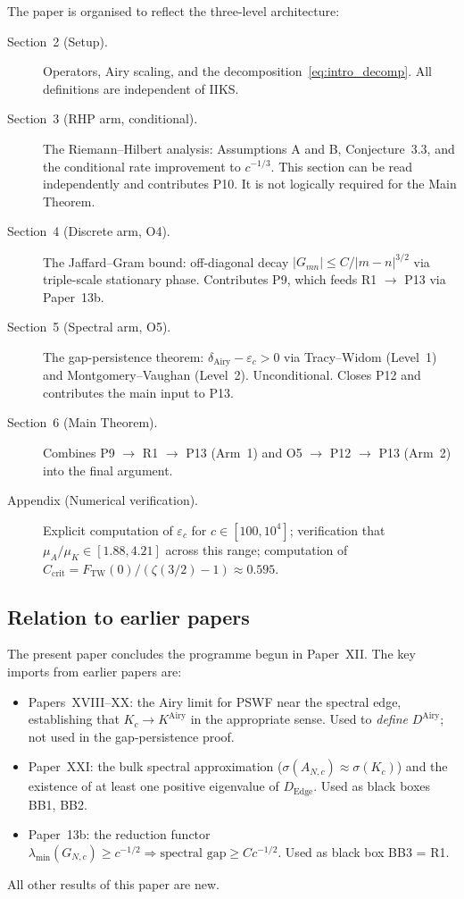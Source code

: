 \documentclass[12pt,a4paper]{amsart}
\newcommand{\DAi}{D^{\mathrm{Airy}}}
\newcommand{\KAi}{K^{\mathrm{Airy}}}
\begin{document}
The paper is organised to reflect the three-level architecture:

\begin{description}
  \item[Section~2 (Setup).]
    Operators, Airy scaling, and the decomposition~\eqref{eq:intro_decomp}.
    All definitions are independent of IIKS.

  \item[Section~3 (RHP arm, conditional).]
    The Riemann--Hilbert analysis: Assumptions A and B, Conjecture~3.3,
    and the conditional rate improvement to $c^{-1/3}$.
    This section can be read independently and contributes P10.
    It is not logically required for the Main Theorem.

  \item[Section~4 (Discrete arm, O4).]
    The Jaffard--Gram bound: off-diagonal decay $|G_{mn}| \le C/|m-n|^{3/2}$
    via triple-scale stationary phase.
    Contributes P9, which feeds R1 $\to$ P13 via Paper~13b.

  \item[Section~5 (Spectral arm, O5).]
    The gap-persistence theorem: $\delta_{\mathrm{Airy}} - \varepsilon_c > 0$
    via Tracy--Widom (Level~1) and Montgomery--Vaughan (Level~2).
    Unconditional. Closes P12 and contributes the main input to P13.

  \item[Section~6 (Main Theorem).]
    Combines P9 $\to$ R1 $\to$ P13 (Arm~1) and
    O5 $\to$ P12 $\to$ P13 (Arm~2) into the final argument.

  \item[Appendix (Numerical verification).]
    Explicit computation of $\varepsilon_c$ for $c \in [100, 10^4]$;
    verification that $\mu_A/\mu_K \in [1.88, 4.21]$ across this range;
    computation of $C_{\mathrm{crit}} = F_{\mathrm{TW}}(0)/(\zeta(3/2)-1) \approx 0.595$.
\end{description}

\subsection*{Relation to earlier papers}

The present paper concludes the programme begun in Paper~XII.
The key imports from earlier papers are:
\begin{itemize}
  \item Papers~XVIII--XX: the Airy limit for PSWF near the spectral edge,
    establishing that $K_c \to \KAi$ in the appropriate sense.
    Used to \emph{define} $\DAi$; not used in the gap-persistence proof.
  \item Paper~XXI: the bulk spectral approximation ($\sigma(A_{N,c}) \approx \sigma(K_c)$)
    and the existence of at least one positive eigenvalue of $D_{\mathrm{Edge}}$.
    Used as black boxes BB1, BB2.
  \item Paper~13b: the reduction functor
    $\lambda_{\min}(G_{N,c}) \ge c^{-1/2} \Rightarrow \text{spectral gap} \ge C c^{-1/2}$.
    Used as black box BB3 = R1.
\end{itemize}
All other results of this paper are new.
\end{document}
